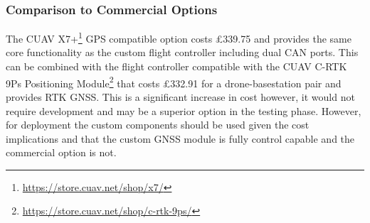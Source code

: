 \subsubsection{Comparison to Commercial Options}

The CUAV X7+\footnote{\url{https://store.cuav.net/shop/x7/}} GPS compatible option costs £339.75 and provides the same core functionality as the custom flight controller including dual \gls{CAN} ports. This can be combined with the flight controller compatible with the CUAV C-RTK 9Ps Positioning Module\footnote{\url{https://store.cuav.net/shop/c-rtk-9ps/}} that costs £332.91 for a drone-basestation pair and provides \gls{RTK} \gls{GNSS}. This is a significant increase in cost however, it would not require development and may be a superior option in the testing phase. However, for deployment the custom components should be used given the cost implications and that the custom \gls{GNSS} module is fully control capable and the commercial option is not. 
